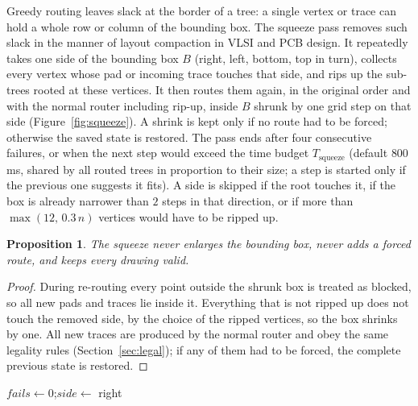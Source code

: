 \documentclass[11pt,a4paper]{article}
\newtheorem{proposition}{Proposition}
\theoremstyle{remark}
\begin{document}
Greedy routing leaves slack at the border of a tree: a single vertex or trace can hold a whole row or column of the
bounding box. The squeeze pass removes such slack in the manner of layout compaction in VLSI and PCB
design. It repeatedly takes one side of the bounding box $B$ (right, left, bottom, top in turn), collects every vertex
whose pad or incoming trace touches that side, and rips up the sub-trees rooted at these vertices. It then routes
them again, in the original order and with the normal router including rip-up, inside $B$ shrunk by one grid step on
that side (Figure~\ref{fig:squeeze}). A shrink is kept only if no route had to be forced; otherwise the saved state
is restored. The pass ends after four consecutive failures, or when the next step would exceed the time budget
$T_{\mathrm{squeeze}}$ (default $800$\,ms, shared by all routed trees in proportion to their size; a step is started
only if the previous one suggests it fits). A side is skipped if the root touches it, if the box is already
narrower than $2$ steps in that direction, or if more than $\max(12,\,0.3\,n)$ vertices would have to be ripped up.

\begin{proposition}
The squeeze never enlarges the bounding box, never adds a forced route, and keeps every drawing valid.
\end{proposition}
\begin{proof}
During re-routing every point outside the shrunk box is treated as blocked, so all new pads and traces lie inside it.
Everything that is not ripped up does not touch the removed side, by the choice of the ripped vertices, so the box
shrinks by one. All new traces are produced by the normal router and obey the same legality rules
(Section~\ref{sec:legal}); if any of them had to be forced, the complete previous state is restored.
\end{proof}

\begin{algorithm}[t]
\caption{\textsc{Squeeze}$(T_{\mathrm{squeeze}})$}\label{alg:squeeze}
\DontPrintSemicolon
$\mathit{fails}\gets0$;\quad $\mathit{side}\gets$ right\;
\end{algorithm}
\end{document}
